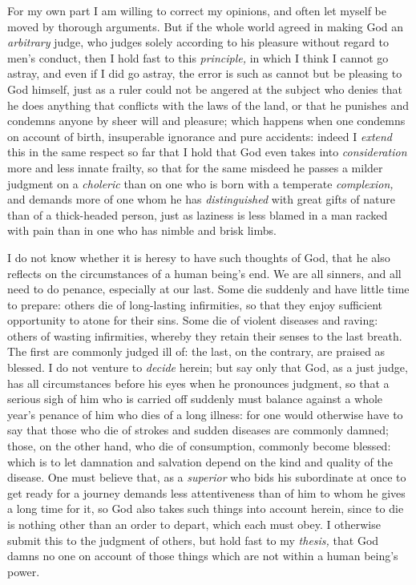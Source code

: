 \documentclass[12pt,a4paper,openany]{book}
\newcommand{\opage}[1]{\marginnote{\footnotesize\textit{[#1]}}}
\begin{document}
For my own part I am willing to correct my opinions, and often let myself be
moved by thorough arguments. But if the whole world agreed in making God an
\textit{arbitrary} judge, who judges solely according to his pleasure without
regard to men's conduct, then I hold fast to this \textit{principle,} in which I
think I cannot go astray, and even if I did go astray, the error is such as cannot
but be pleasing to God himself, just as a ruler could not be angered at the
subject who denies that he does anything that conflicts with the laws of the
land, or that he punishes and condemns anyone by sheer will and pleasure; which
happens when one condemns on account of birth, insuperable ignorance and pure
accidents: indeed I \textit{extend} this in
\setcounter{footnote}{0}%
\opage{26}the same respect so far that I hold that God even takes into
\textit{consideration} more and less innate frailty, so that for the same
misdeed he passes a milder judgment on a \textit{choleric} than on one who is
born with a temperate \textit{complexion,} and demands more of one whom he has
\textit{distinguished} with great gifts of nature than of a thick-headed person,
just as laziness is less blamed in a man racked with pain than in one who has
nimble and brisk limbs.

I do not know whether it is heresy to have such thoughts of God, that he also
reflects on the circumstances of a human being's end. We are all
sinners, and all need to do penance, especially at our last. Some die suddenly
and have little time to prepare: others die of long-lasting infirmities, so that
they enjoy sufficient opportunity to atone for their sins. Some die of violent
diseases and raving: others of wasting infirmities, whereby they retain their
senses to the last breath. The first are commonly judged ill of: the last, on the
contrary, are praised as blessed. I do not venture to \textit{decide} herein; but
say only that God, as a just judge, has all circumstances before his eyes when he
pronounces judgment, so that a serious sigh of him who is carried off suddenly
must balance against a whole year's penance of him who dies of a long illness:
for one would otherwise have to say that those who die of strokes and sudden
diseases are commonly damned; those, on the other hand, who die of consumption,
commonly become blessed: which is to let damnation and salvation depend on the
kind and quality of the disease. One must believe that, as a \textit{superior}
who bids his subordinate at once to get ready for a journey demands less
attentiveness than of him to whom he gives a long time for it, so God also takes
such things into account herein, since to die is nothing other than an order to
depart, which each must obey. I otherwise submit this to the judgment of others,
but hold fast to my \textit{thesis,} that God damns no one on account of those
things which are not within a human being's power.
\end{document}

